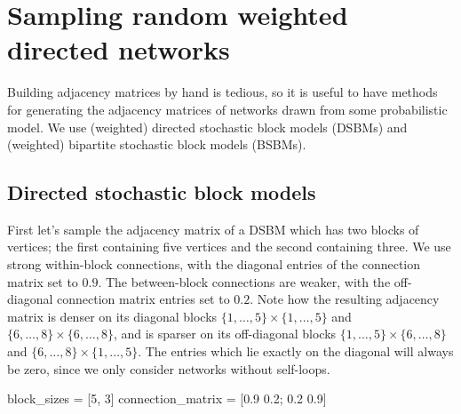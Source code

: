 \documentclass{article}
\begin{document}
\section{Sampling random weighted directed networks}

Building adjacency matrices by hand is tedious,
so it is useful to have methods for generating
the adjacency matrices of networks drawn from some probabilistic model.
We use (weighted) directed stochastic block models (DSBMs) and
(weighted) bipartite stochastic block models (BSBMs).

\subsection{Directed stochastic block models}

First let's sample the adjacency matrix of a DSBM
which has two blocks of vertices;
the first containing five vertices and the second containing three.
We use strong within-block connections,
with the diagonal entries of the connection matrix set to $0.9$.
The between-block connections are weaker, with the off-diagonal
connection matrix entries set to $0.2$.
Note how the resulting adjacency matrix is denser
on its diagonal blocks
$\{1, \dots, 5\} \times \{1, \dots, 5\}$
and
$\{6, \dots, 8\} \times \{6, \dots, 8\}$,
and is sparser on its off-diagonal blocks
$\{1, \dots, 5\} \times \{6, \dots, 8\}$
and
$\{6, \dots, 8\} \times \{1, \dots, 5\}$.
The entries which lie exactly on the diagonal will
always be zero,
since we only consider networks without self-loops.

\begin{tcolorbox}[colback=black!5!white,colframe=black!15!white]
\begin{juliablock}
block_sizes = [5, 3]
connection_matrix = [0.9 0.2; 0.2 0.9]
\end{juliablock}
\end{tcolorbox}

\end{document}
